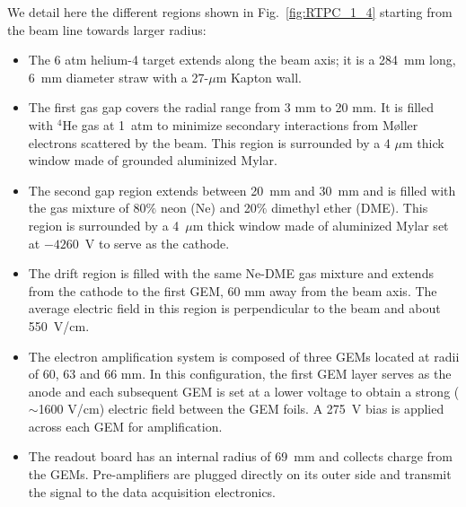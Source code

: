 \documentclass[preprint,5p]{elsarticle}
\begin{document}
We detail here the different regions shown in Fig.~\ref{fig:RTPC_1_4} starting 
from the beam line towards larger radius:\\
\begin{itemize}
   \item The 6 atm helium-4 target extends along the beam axis; it 
      is a 284~mm long, 6~mm diameter straw with a 27-$\mu$m Kapton wall.
   \item The first gas gap covers the radial range from 3 mm to 20 mm. It is 
      filled with $^{4}$He gas at 1~atm to minimize secondary interactions from
      M\o{}ller electrons scattered by the beam. This region is surrounded by 
      a 4 $\mu$m thick window made of grounded aluminized Mylar.
   \item The second gap region extends between 20~mm and 30~mm and is filled with the 
      gas mixture of 80$\%$ neon (Ne) and 20$\%$ dimethyl ether (DME). This region 
      is surrounded by a 4~$\mu$m thick window made of aluminized Mylar set at $- 4260$~V 
      to serve as the cathode.
   \item The drift region is filled with the same Ne-DME gas mixture and extends 
      from the cathode to the first GEM, 60 mm away from the beam axis. The average 
      electric field in this region is perpendicular to the beam and about 550~V/cm.
   \item The electron amplification system is composed of three GEMs located at 
      radii of 60, 63 and 66 mm. In this configuration, the first GEM layer 
      serves as the anode and each subsequent GEM is set at a lower voltage to
      obtain a strong ($\sim$1600 V/cm) electric field between the GEM foils. A 
      275~V bias is applied across each GEM for amplification.
   \item The readout board has an internal radius of 69~mm and collects charge
     from the GEMs. Pre-amplifiers are plugged directly on its outer side and
     transmit the signal to the data acquisition electronics.
\end{itemize}
\end{document}
